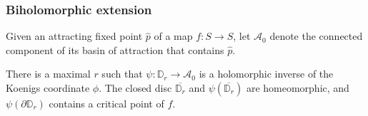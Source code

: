 \documentclass[11pt,a4paper]{article}
\begin{document}
\subsubsection{Biholomorphic extension}
\setcounter{definition}{7}\begin{definition}
Given an attracting fixed point $\widehat p$ of a map $f\colon S\to S$, let $\mathcal A_0$ denote the connected component of its basin of attraction that contains $\widehat p$.
\end{definition}
\setcounter{theorem}{12}\begin{theorem}\label{cd2:maximal}
There is a maximal $r$ such that $\psi\colon\mathbb D_r\to\mathcal A_0$ is a holomorphic inverse of the Koenigs coordinate $\phi$. The closed disc $\overline{\mathbb D_r}$ and $\psi(\overline{\mathbb D_r})$ are homeomorphic, and $\psi(\partial\mathbb D_r)$ contains a critical point of $f$.
\end{theorem}
\end{document}
